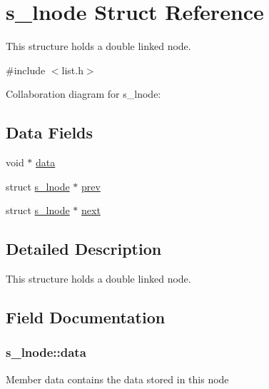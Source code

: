 \hypertarget{structs__lnode}{}\section{s\+\_\+lnode Struct Reference}
\label{structs__lnode}


This structure holds a double linked node.  




{\ttfamily \#include $<$list.\+h$>$}



Collaboration diagram for s\+\_\+lnode\+:
\subsection*{Data Fields}
\begin{DoxyCompactItemize}
\item 
void $\ast$ \hyperlink{structs__lnode_a4f586e4c3ddb54d11cd5ae97ebaec850}{data}
\item 
struct \hyperlink{structs__lnode}{s\+\_\+lnode} $\ast$ \hyperlink{structs__lnode_afe1761de9a211149f32219f03492d098}{prev}
\item 
struct \hyperlink{structs__lnode}{s\+\_\+lnode} $\ast$ \hyperlink{structs__lnode_add1117deef5047ce064a52f68e2d611d}{next}
\end{DoxyCompactItemize}


\subsection{Detailed Description}
This structure holds a double linked node. 

\subsection{Field Documentation}
\hypertarget{structs__lnode_a4f586e4c3ddb54d11cd5ae97ebaec850}{}
\subsubsection[{data}]{\setlength{\rightskip}{0pt plus 5cm}s\+\_\+lnode\+::data}\label{structs__lnode_a4f586e4c3ddb54d11cd5ae97ebaec850}
Member \textquotesingle{}data\textquotesingle{} contains the data stored in this node \hypertarget{structs__lnode_add1117deef5047ce064a52f68e2d611d}{}
